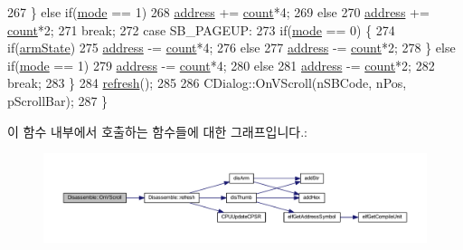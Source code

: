 \begin{DoxyCode}
267     \} \textcolor{keywordflow}{else} \textcolor{keywordflow}{if}(\mbox{\hyperlink{class_disassemble_a30b707e1da3b01abda044e78929404cc}{mode}} == 1)
268       \mbox{\hyperlink{class_disassemble_a960ac8317ada7182e59132a3ee4afb48}{address}} += \mbox{\hyperlink{class_disassemble_a06c362364d2e01bac10fbcfb7ab28f50}{count}}*4;
269     \textcolor{keywordflow}{else}
270       \mbox{\hyperlink{class_disassemble_a960ac8317ada7182e59132a3ee4afb48}{address}} += \mbox{\hyperlink{class_disassemble_a06c362364d2e01bac10fbcfb7ab28f50}{count}}*2;
271     \textcolor{keywordflow}{break};
272   \textcolor{keywordflow}{case} SB\_PAGEUP:
273     \textcolor{keywordflow}{if}(\mbox{\hyperlink{class_disassemble_a30b707e1da3b01abda044e78929404cc}{mode}} == 0) \{
274       \textcolor{keywordflow}{if}(\mbox{\hyperlink{_g_b_a_8h_adeb5542a7f7ef80090a22d0133606250}{armState}})
275         \mbox{\hyperlink{class_disassemble_a960ac8317ada7182e59132a3ee4afb48}{address}} -= \mbox{\hyperlink{class_disassemble_a06c362364d2e01bac10fbcfb7ab28f50}{count}}*4;
276       \textcolor{keywordflow}{else}
277         \mbox{\hyperlink{class_disassemble_a960ac8317ada7182e59132a3ee4afb48}{address}} -= \mbox{\hyperlink{class_disassemble_a06c362364d2e01bac10fbcfb7ab28f50}{count}}*2;
278     \} \textcolor{keywordflow}{else} \textcolor{keywordflow}{if}(\mbox{\hyperlink{class_disassemble_a30b707e1da3b01abda044e78929404cc}{mode}} == 1)
279       \mbox{\hyperlink{class_disassemble_a960ac8317ada7182e59132a3ee4afb48}{address}} -= \mbox{\hyperlink{class_disassemble_a06c362364d2e01bac10fbcfb7ab28f50}{count}}*4;
280     \textcolor{keywordflow}{else}
281       \mbox{\hyperlink{class_disassemble_a960ac8317ada7182e59132a3ee4afb48}{address}} -= \mbox{\hyperlink{class_disassemble_a06c362364d2e01bac10fbcfb7ab28f50}{count}}*2;
282     \textcolor{keywordflow}{break};
283   \}
284   \mbox{\hyperlink{class_disassemble_a7cdf11d53ce0f170ad7dd8fc66961805}{refresh}}();
285   
286   CDialog::OnVScroll(nSBCode, nPos, pScrollBar);
287 \}
\end{DoxyCode}
이 함수 내부에서 호출하는 함수들에 대한 그래프입니다.\+:
\nopagebreak
\begin{figure}[H]
\begin{center}
\leavevmode
\includegraphics[width=350pt]{class_disassemble_a96149abe6cfe456c0d799dfe59b19826_cgraph}
\end{center}
\end{figure}
\mbox{\label{class_disassemble_a2ff6c6b502de3f37aaff6c2f188157a8}} 
